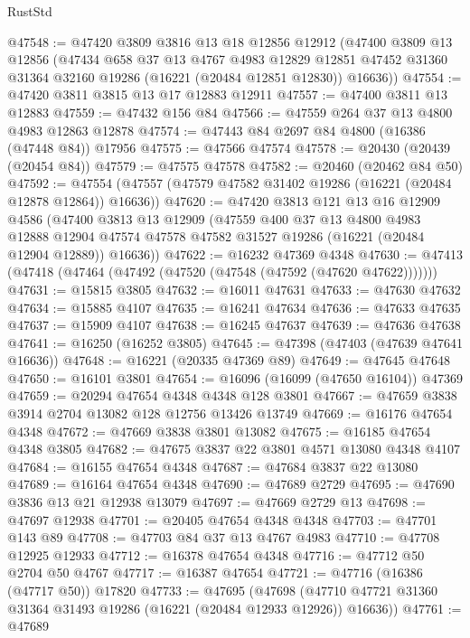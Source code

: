 \begin{lexlean}{RustStd}
\begin{coremodule}
@47548 := @47420
    @3809
    @3816
    @13
    @18
    @12856
    @12912
    (@47400
      @3809
      @13
      @12856
      (@47434
        @658
        @37
        @13
        @4767
        @4983
        @12829
        @12851
        @47452
        @31360
        @31364
        @32160
        @19286
        (@16221 (@20484 @12851 @12830))
        @16636))
@47554 := @47420 @3811 @3815 @13 @17 @12883 @12911
@47557 := @47400 @3811 @13 @12883
@47559 := @47432 @156 @84
@47566 := @47559 @264 @37 @13 @4800 @4983 @12863 @12878
@47574 := @47443 @84 @2697 @84 @4800 (@16386 (@47448 @84)) @17956
@47575 := @47566 @47574
@47578 := @20430 (@20439 (@20454 @84))
@47579 := @47575 @47578
@47582 := @20460 (@20462 @84 @50)
@47592 := @47554 (@47557 (@47579 @47582 @31402 @19286 (@16221 (@20484 @12878 @12864)) @16636))
@47620 := @47420
    @3813
    @121
    @13
    @16
    @12909
    @4586
    (@47400
      @3813
      @13
      @12909
      (@47559
        @400
        @37
        @13
        @4800
        @4983
        @12888
        @12904
        @47574
        @47578
        @47582
        @31527
        @19286
        (@16221 (@20484 @12904 @12889))
        @16636))
@47622 := @16232 @47369 @4348
@47630 := @47413 (@47418 (@47464 (@47492 (@47520 (@47548 (@47592 (@47620 @47622)))))))
@47631 := @15815 @3805
@47632 := @16011 @47631
@47633 := @47630 @47632
@47634 := @15885 @4107
@47635 := @16241 @47634
@47636 := @47633 @47635
@47637 := @15909 @4107
@47638 := @16245 @47637
@47639 := @47636 @47638
@47641 := @16250 (@16252 @3805)
@47645 := @47398 (@47403 (@47639 @47641 @16636))
@47648 := @16221 (@20335 @47369 @89)
@47649 := @47645 @47648
@47650 := @16101 @3801
@47654 := @16096 (@16099 (@47650 @16104)) @47369
@47659 := @20294 @47654 @4348 @4348 @128 @3801
@47667 := @47659 @3838 @3914 @2704 @13082 @128 @12756 @13426 @13749
@47669 := @16176 @47654 @4348
@47672 := @47669 @3838 @3801 @13082
@47675 := @16185 @47654 @4348 @3805
@47682 := @47675 @3837 @22 @3801 @4571 @13080 @4348 @4107
@47684 := @16155 @47654 @4348
@47687 := @47684 @3837 @22 @13080
@47689 := @16164 @47654 @4348
@47690 := @47689 @2729
@47695 := @47690 @3836 @13 @21 @12938 @13079
@47697 := @47669 @2729 @13
@47698 := @47697 @12938
@47701 := @20405 @47654 @4348 @4348
@47703 := @47701 @143 @89
@47708 := @47703 @84 @37 @13 @4767 @4983
@47710 := @47708 @12925 @12933
@47712 := @16378 @47654 @4348
@47716 := @47712 @50 @2704 @50 @4767
@47717 := @16387 @47654
@47721 := @47716 (@16386 (@47717 @50)) @17820
@47733 := @47695
    (@47698 (@47710 @47721 @31360 @31364 @31493 @19286 (@16221 (@20484 @12933 @12926)) @16636))
@47761 := @47689

\end{coremodule}
\end{lexlean}
